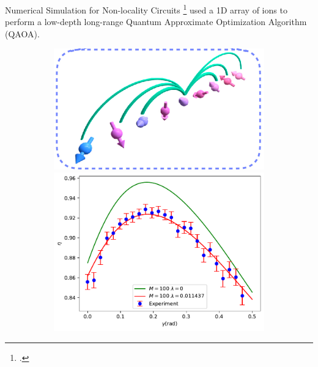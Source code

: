 \documentclass[10pt]{beamer}
\begin{document}
\begin{CJK}{UTF8}{gbsn}
\begin{frame}[fragile]{Numerical Simulation for Non-locality Circuits}
  \cite{pagano2020quantum}\footcite{pagano2020quantum} used a 1D array of ions to perform a low-depth long-range Quantum Approximate Optimization Algorithm (QAOA).
  \begin{figure}
    \centering
    \begin{subfigure}[t]{0.9\textwidth}
    \end{subfigure}
    \vfill
    \begin{subfigure}[t]{\textwidth}
      \begin{minipage}[t]{0.45\textwidth}
        \centering
        \includegraphics[width=\textwidth]{fig/ion2.png}
      \end{minipage}
      \hfill
      \begin{minipage}[t]{0.45\textwidth}
        \centering
        \includegraphics[width=\textwidth]{fig/QAOA.pdf}

\end{minipage}
\end{subfigure}
\end{figure}
\end{frame}
\end{CJK}
\end{document}
